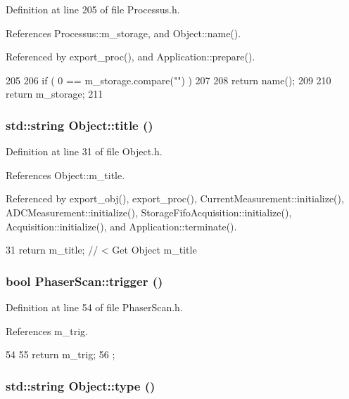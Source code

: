 Definition at line 205 of file Processus.h.

References Processus::m\_\-storage, and Object::name().

Referenced by export\_\-proc(), and Application::prepare().


\begin{DoxyCode}
205                        {
206     if ( 0 == m_storage.compare("") )
207     {
208       return name();
209     }
210     return m_storage;
211   }
\end{DoxyCode}
\hypertarget{classObject_a73a0f1a41828fdd8303dd662446fb6c3}{
\subsubsection[{title}]{\setlength{\rightskip}{0pt plus 5cm}std::string Object::title ()}}
\label{classObject_a73a0f1a41828fdd8303dd662446fb6c3}


Definition at line 31 of file Object.h.

References Object::m\_\-title.

Referenced by export\_\-obj(), export\_\-proc(), CurrentMeasurement::initialize(), ADCMeasurement::initialize(), StorageFifoAcquisition::initialize(), Acquisition::initialize(), and Application::terminate().


\begin{DoxyCode}
31 { return m_title;      } // < Get Object m_title
\end{DoxyCode}
\hypertarget{classPhaserScan_a6ae0b3511064540555ef9770c63febc4}{
\subsubsection[{trigger}]{\setlength{\rightskip}{0pt plus 5cm}bool PhaserScan::trigger ()}}
\label{classPhaserScan_a6ae0b3511064540555ef9770c63febc4}


Definition at line 54 of file PhaserScan.h.

References m\_\-trig.


\begin{DoxyCode}
54                  {
55     return m_trig;
56   };
\end{DoxyCode}
\hypertarget{classObject_a84f99f70f144a83e1582d1d0f84e4e62}{
\subsubsection[{type}]{\setlength{\rightskip}{0pt plus 5cm}std::string Object::type ()}}
\label{classObject_a84f99f70f144a83e1582d1d0f84e4e62}


